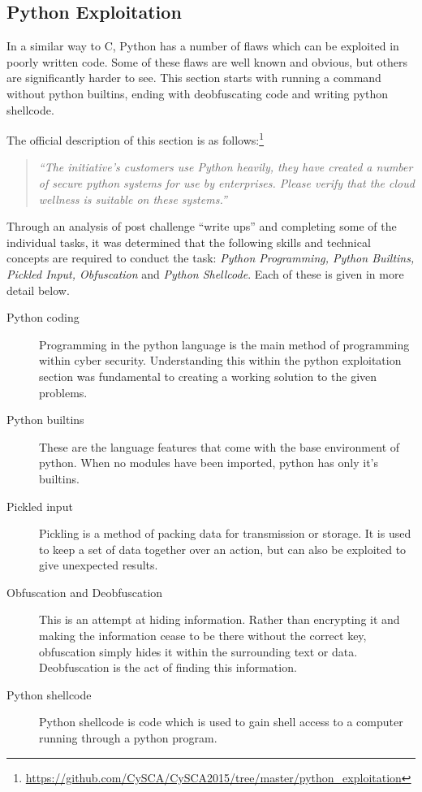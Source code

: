 \documentclass[a4paper,11pt]{report}
\begin{document}
		\subsection{Python Exploitation}
			In a similar way to C, Python has a number of flaws which can be exploited in poorly written code. 
			Some of these flaws are well known and obvious, but others are significantly harder to see. 
			This section starts with running a command without python builtins, ending with deobfuscating code and writing python shellcode. 

			The official description of this section is as follows:\footnote{\url{https://github.com/CySCA/CySCA2015/tree/master/python\_exploitation}}
			\begin{quote}
				\textit{``The initiative's customers use Python heavily, they have created a number of secure python systems for use by enterprises. Please verify that the cloud wellness is suitable on these systems.''}
			\end{quote}

			Through an analysis of post challenge ``write ups'' and completing some of the individual tasks, 
			it was determined that the following skills and technical concepts are required to conduct the task: 
			\textit{Python Programming, Python Builtins, Pickled Input, Obfuscation} and \textit{Python Shellcode}.
			Each of these is given in more detail below. 
			\begin{description}
				\item[Python coding]
					Programming in the python language is the main method of programming within cyber security. 
					Understanding this within the python exploitation section was fundamental to creating a working solution to the given problems. 
				\item[Python builtins]
					These are the language features that come with the base environment of python. 
					When no modules have been imported, python has only it's builtins. 
				\item[Pickled input]
					Pickling is a method of packing data for transmission or storage. 
					It is used to keep a set of data together over an action, but can also be exploited to give unexpected results. 
				\item[Obfuscation and Deobfuscation]
					This is an attempt at hiding information. 
					Rather than encrypting it and making the information cease to be there without the correct key, obfuscation simply hides it within the surrounding text or data. 
					Deobfuscation is the act of finding this information.
				\item[Python shellcode] 
					Python shellcode is code which is used to gain shell access to a computer running through a python program. 
			\end{description}
\end{document}
